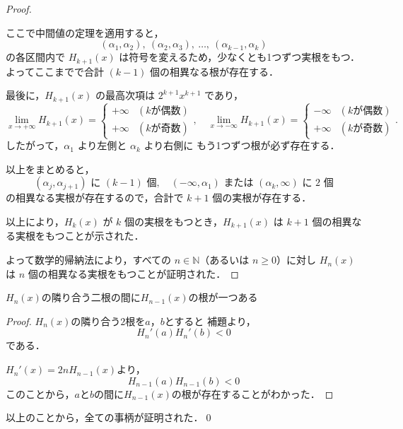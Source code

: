 \documentclass[a4paper,10pt,fleqn]{ltjsarticle}
\begin{document}
\begin{leftbar}
\begin{proof}
\begin{enumerate}[(I)]
                  ここで中間値の定理を適用すると，
                  \[
                      (\alpha_1,\alpha_2),~(\alpha_2,\alpha_3),~\dots,~(\alpha_{k-1},\alpha_k)
                  \]
                  の各区間内で $H_{k+1}(x)$ は符号を変えるため，少なくとも1つずつ実根をもつ．
                  よってここまでで合計 $(k-1)$ 個の相異なる根が存在する．

                  最後に，$H_{k+1}(x)$ の最高次項は $2^{k+1} x^{k+1}$ であり，
                  \[
                      \lim_{x \to +\infty} H_{k+1}(x) =
                      \begin{cases}
                          +\infty & (k \text{が偶数}) \\
                          +\infty & (k \text{が奇数})
                      \end{cases},
                      \quad
                      \lim_{x \to -\infty} H_{k+1}(x) =
                      \begin{cases}
                          -\infty & (k \text{が偶数}) \\
                          +\infty & (k \text{が奇数})
                      \end{cases}.
                  \]
                  したがって，$\alpha_1$ より左側と $\alpha_k$ より右側に
                  もう1つずつ根が必ず存在する．

                  以上をまとめると，
                  \[
                      (\alpha_j,\alpha_{j+1}) \text{ に } (k-1)\text{ 個}, \quad
                      (-\infty,\alpha_1) \text{ または } (\alpha_k,\infty) \text{ に } 2\text{ 個}
                  \]
                  の相異なる実根が存在するので，合計で $k+1$ 個の実根が存在する．

                  以上により，$H_k(x)$ が $k$ 個の実根をもつとき，$H_{k+1}(x)$ は
                  $k+1$ 個の相異なる実根をもつことが示された．
        \end{enumerate}
        よって数学的帰納法により，すべての $n \in \mathbb{N}$（あるいは $n \ge 0$）に対し
        $H_n(x)$ は $n$ 個の相異なる実根をもつことが証明された．
    \end{proof}
\end{leftbar}


$H_n(x)$の隣り合う二根の間に$H_{n-1}(x)$の根が一つある


\begin{leftbar}
    \begin{proof}
        $H_n(x)$の隣り合う$2$根を$a$，$b$とすると
        補題より，
        \[
            H_n '(a) H_n '(b)<0
        \]
        である．

        $ H_n '(x)=2n H_{n-1}(x)$より，
        \[
            H_{n-1}(a) H_{n-1}(b) < 0
        \]
        このことから，$a$と$b$の間に$H_{n-1}(x)$の根が存在することがわかった．
    \end{proof}
\end{leftbar}
以上のことから，全ての事柄が証明された．\qed
\end{document}
